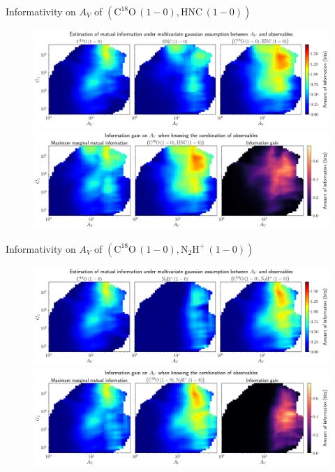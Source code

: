 \documentclass{beamer}
\begin{document}
\begin{frame}{Informativity on $A_V$ of $\left(\mathrm{C^{18}O\,(1-0)},\mathrm{HNC\,(1-0)}\right)$}
    \begin{figure}
        \centering
        \includegraphics[width=0.95\linewidth]{../linearinfo/av__c18o10_hnc10_linearinfo.png}
        \vfill
        \includegraphics[width=0.95\linewidth]{../linearinfo/av__c18o10_hnc10_linearinfo_gain.png}
    \end{figure}
\end{frame}

\begin{frame}{Informativity on $A_V$ of $\left(\mathrm{C^{18}O\,(1-0)},\mathrm{N_2H^+\,(1-0)}\right)$}
    \begin{figure}
        \centering
        \includegraphics[width=0.95\linewidth]{../linearinfo/av__c18o10_n2hp10_linearinfo.png}
        \vfill
        \includegraphics[width=0.95\linewidth]{../linearinfo/av__c18o10_n2hp10_linearinfo_gain.png}
    \end{figure}
\end{frame}
\end{document}
